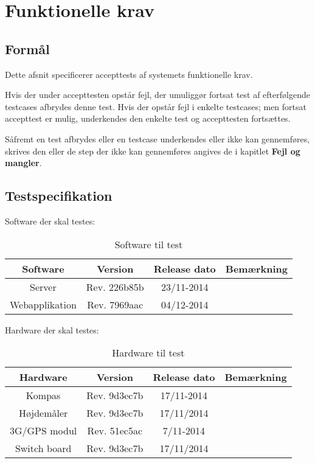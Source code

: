 \chapter{Funktionelle krav}

\vspace{-1cm}

\section*{Formål}
\vspace{-0.5cm}

Dette afsnit specificerer accepttests af systemets funktionelle krav. 

Hvis der under accepttesten opstår fejl, der umuliggør fortsat test af efterfølgende testcases afbrydes denne test. Hvis der opstår fejl i enkelte testcases; men fortsat accepttest er mulig, underkendes den enkelte test og accepttesten fortsættes.

Såfremt en test afbrydes eller en testcase underkendes eller ikke kan gennemføres, skrives den eller de step der ikke kan gennemføres angives de i kapitlet \textbf{Fejl og mangler}. 


\section*{Testspecifikation}
\vspace{-0.5cm}
Software der skal testes:
\begin{table}[H]
	\centering
		\begin{tabular}{|c|c|c|c|}
			\hline
			Software & Version & Release dato & Bemærkning \\ \hline
			Server & Rev. 226b85b & 23/11-2014 & \\ \hline			
			Webapplikation & Rev. 7969aac & 04/12-2014 &\\ \hline
		\end{tabular}
	\caption{Software til test}
\end{table}

Hardware der skal testes:
\begin{table}[H]
	\centering
		\begin{tabular}{|c|c|c|c|}
			\hline
			Hardware & Version & Release dato & Bemærkning \\ \hline
			Kompas 			& Rev. 9d3ec7b & 17/11-2014 &  \\ \hline			
			Højdemåler 		& Rev. 9d3ec7b & 17/11/2014 &  \\ \hline
			3G/GPS modul 	& Rev. 51ec5ac & 7/11-2014 &  \\ \hline
			Switch board 	& Rev. 9d3ec7b & 17/11/2014 &  \\ \hline
		\end{tabular}
	\caption{Hardware til test}
\end{table}

